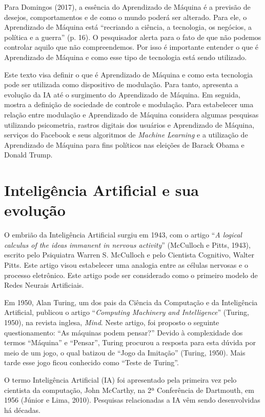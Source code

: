 Para Domingos (2017), a essência do Aprendizado de Máquina é a previsão
de desejos, comportamentos e de como o mundo poderá ser alterado. Para
ele, o Aprendizado de Máquina está ``recriando a ciência, a tecnologia,
os negócios, a política e a guerra'' (p. 16). O pesquisador alerta para
o fato de que não podemos controlar aquilo que não compreendemos. Por
isso é importante entender o que é Aprendizado de Máquina e como esse
tipo de tecnologia está sendo utilizado.

Este texto visa definir o que é Aprendizado de Máquina e como esta
tecnologia pode ser utilizada como dispositivo de modulação. Para tanto,
apresenta a evolução da IA até o surgimento do Aprendizado de Máquina.
Em seguida, mostra a definição de sociedade de controle e modulação.
Para estabelecer uma relação entre modulação e Aprendizado de Máquina
considera algumas pesquisas utilizando psicometria, rastros digitais dos
usuários e Aprendizado de Máquina, serviços do Facebook e seus
algoritmos de \emph{Machine Learning} e a utilização de Aprendizado de
Máquina para fins políticos nas eleições de Barack Obama e Donald Trump.

\section{Inteligência Artificial e sua evolução}

O embrião da Inteligência Artificial surgiu em 1943, com o artigo
``\emph{A logical calculus of the ideas immanent in nervous activity}''
(McCulloch e Pitts, 1943), escrito pelo Psiquiatra Warren S. McCulloch e
pelo Cientista Cognitivo, Walter Pitts. Este artigo visou estabelecer
uma analogia entre as células nervosas e o processo eletrônico. Este
artigo pode ser considerado como o primeiro modelo de Redes Neurais
Artificiais.

Em 1950, Alan Turing, um dos pais da Ciência da Computação e da
Inteligência Artificial, publicou o artigo ``\emph{Computing Machinery
and Intelligence}'' (Turing, 1950), na revista inglesa, \emph{Mind}.
Neste artigo, foi proposto o seguinte questionamento: ``As máquinas
podem pensar?'' Devido à complexidade dos termos ``Máquina'' e
``Pensar'', Turing procurou a resposta para esta dúvida por meio de um
jogo, o qual batizou de ``Jogo da Imitação'' (Turing, 1950). Mais tarde
esse jogo ficou conhecido como ``Teste de Turing''.

O termo Inteligência Artificial (IA) foi apresentado pela primeira vez
pelo cientista da computação, John McCarthy, na 2ª Conferência de
Dartmouth, em 1956 (Júnior e Lima, 2010). Pesquisas relacionadas a IA
vêm sendo desenvolvidas há décadas.

